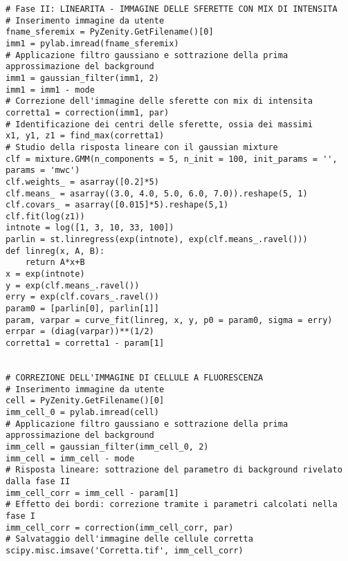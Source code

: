 \begin{lstlisting}
# Fase II: LINEARITA - IMMAGINE DELLE SFERETTE CON MIX DI INTENSITA
# Inserimento immagine da utente
fname_sferemix = PyZenity.GetFilename()[0]
imm1 = pylab.imread(fname_sferemix)
# Applicazione filtro gaussiano e sottrazione della prima approssimazione del background
imm1 = gaussian_filter(imm1, 2)
imm1 = imm1 - mode
# Correzione dell'immagine delle sferette con mix di intensita
corretta1 = correction(imm1, par)
# Identificazione dei centri delle sferette, ossia dei massimi
x1, y1, z1 = find_max(corretta1)
# Studio della risposta lineare con il gaussian mixture
clf = mixture.GMM(n_components = 5, n_init = 100, init_params = '', params = 'mwc') 
clf.weights_ = asarray([0.2]*5)
clf.means_ = asarray((3.0, 4.0, 5.0, 6.0, 7.0)).reshape(5, 1)
clf.covars_ = asarray([0.015]*5).reshape(5,1)
clf.fit(log(z1))
intnote = log([1, 3, 10, 33, 100])
parlin = st.linregress(exp(intnote), exp(clf.means_.ravel()))
def linreg(x, A, B):
    return A*x+B
x = exp(intnote)
y = exp(clf.means_.ravel())
erry = exp(clf.covars_.ravel())
param0 = [parlin[0], parlin[1]]
param, varpar = curve_fit(linreg, x, y, p0 = param0, sigma = erry)
errpar = (diag(varpar))**(1/2)
corretta1 = corretta1 - param[1]


# CORREZIONE DELL'IMMAGINE DI CELLULE A FLUORESCENZA
# Inserimento immagine da utente
cell = PyZenity.GetFilename()[0]
imm_cell_0 = pylab.imread(cell)
# Applicazione filtro gaussiano e sottrazione della prima approssimazione del background
imm_cell = gaussian_filter(imm_cell_0, 2)
imm_cell = imm_cell - mode
# Risposta lineare: sottrazione del parametro di background rivelato dalla fase II
imm_cell_corr = imm_cell - param[1]
# Effetto dei bordi: correzione tramite i parametri calcolati nella fase I
imm_cell_corr = correction(imm_cell_corr, par)
# Salvataggio dell'immagine delle cellule corretta
scipy.misc.imsave('Corretta.tif', imm_cell_corr)
\end{lstlisting}